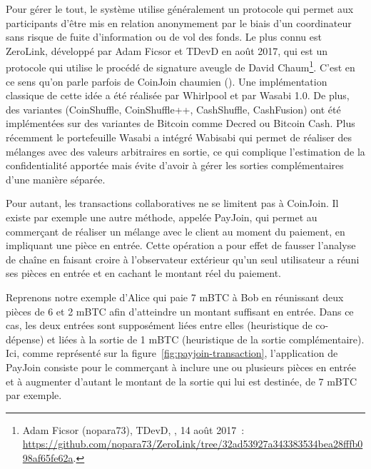 Pour gérer le tout, le système utilise généralement un protocole qui permet aux participants d'être mis en relation anonymement par le biais d'un coordinateur sans risque de fuite d'information ou de vol des fonds. Le plus connu est ZeroLink, développé par Adam Ficsor et TDevD en août 2017, qui est un protocole qui utilise le procédé de signature aveugle de David Chaum\footnote{Adam Ficsor (nopara73), TDevD, , 14 août 2017~: \url{https://github.com/nopara73/ZeroLink/tree/32ad53927a343383534bea28fffb098af65fe62a}.}. C'est en ce sens qu'on parle parfois de CoinJoin chaumien (). Une implémentation classique de cette idée a été réalisée par Whirlpool et par Wasabi 1.0. De plus, des variantes (CoinShuffle, CoinShuffle++, CashShuffle, CashFusion) ont été implémentées sur des variantes de Bitcoin comme Decred ou Bitcoin Cash. Plus récemment le portefeuille Wasabi a intégré Wabisabi qui permet de réaliser des mélanges avec des valeurs arbitraires en sortie, ce qui complique l'estimation de la confidentialité apportée mais évite d'avoir à gérer les sorties complémentaires d'une manière séparée.

Pour autant, les transactions collaboratives ne se limitent pas à CoinJoin. Il existe par exemple une autre méthode, appelée PayJoin, qui permet au commerçant de réaliser un mélange avec le client au moment du paiement, en impliquant une pièce en entrée. Cette opération a pour effet de fausser l'analyse de chaîne en faisant croire à l'observateur extérieur qu'un seul utilisateur a réuni ses pièces en entrée et en cachant le montant réel du paiement.

Reprenons notre exemple d'Alice qui paie 7 mBTC à Bob en réunissant deux pièces de 6 et 2 mBTC afin d'atteindre un montant suffisant en entrée. Dans ce cas, les deux entrées sont supposément liées entre elles (heuristique de co-dépense) et liées à la sortie de 1 mBTC (heuristique de la sortie complémentaire). Ici, comme représenté sur la figure~\ref{fig:payjoin-transaction}, l'application de PayJoin consiste pour le commerçant à inclure une ou plusieurs pièces en entrée et à augmenter d'autant le montant de la sortie qui lui est destinée, de 7 mBTC par exemple.

